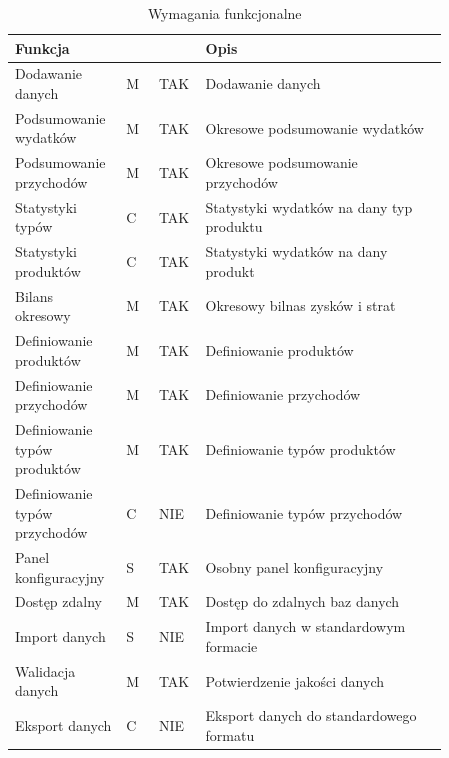 \documentclass[a4paper,10pt, twoside]{report}
\newcommand{\customstyletable}[1]{\footnotesize{\textbf{#1}}}
\newcommand{\customstyletablecentered}[1]{\footnotesize\centering{\textbf{#1}}}
\begin{document}
\begin{large}
\begin{table}[H] %
    \caption{Wymagania funkcjonalne}
    \label{Wymagania funkcjonalne}
    \footnotesize
    \begin{tabular}{|p{0.2\linewidth}|p{0.07\linewidth}|p{0.07\linewidth}|p{0.52\linewidth}|}  %
    \hline                  %
    \customstyletable{Funkcja} & \customstyletablecentered{PRIO} & \customstyletablecentered{IMPL}& \customstyletable{Opis} \\
    \hline
    {Dodawanie danych} & {M} & {TAK} & {Dodawanie danych}\\
    \hline
    {Podsumowanie wydatków} & {M} & {TAK} & {Okresowe podsumowanie wydatków}\\
    \hline
    {Podsumowanie przychodów} & {M} & {TAK} & {Okresowe podsumowanie przychodów}\\
    \hline
    {Statystyki typów} & {C} & {TAK} & {Statystyki wydatków na dany typ produktu}\\
    \hline
    {Statystyki produktów} & {C} & {TAK} & {Statystyki wydatków na dany produkt}\\
    \hline
    {Bilans okresowy} & {M} & {TAK} & {Okresowy bilnas zysków i strat}\\
    \hline
    {Definiowanie produktów} & {M} & {TAK} & {Definiowanie produktów}\\
    \hline
    {Definiowanie przychodów} & {M} & {TAK} & {Definiowanie przychodów}\\
    \hline
    {Definiowanie typów produktów} & {M} & {TAK} & {Definiowanie typów produktów}\\
    \hline
    {Definiowanie typów przychodów} & {C} & {NIE} & {Definiowanie typów przychodów}\\
    \hline
    {Panel konfiguracyjny} & {S} & {TAK} & {Osobny panel konfiguracyjny}\\
    \hline
    {Dostęp zdalny} & {M} & {TAK} & {Dostęp do zdalnych baz danych}\\
    \hline
    {Import danych} & {S} & {NIE} & {Import danych w standardowym formacie}\\
    \hline
    {Walidacja danych} & {M} & {TAK} & {Potwierdzenie jakości danych}\\
    \hline
    {Eksport danych} & {C} & {NIE} & {Eksport danych do standardowego formatu}\\

\end{tabular}
\end{table}
\end{large}
\end{document}
